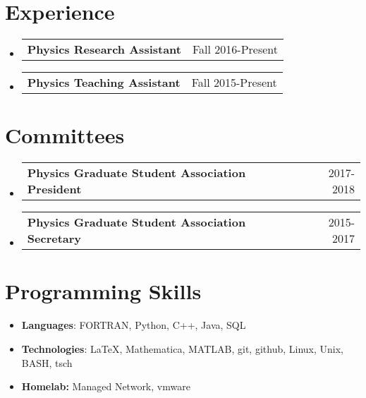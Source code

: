\documentclass[letterpaper,11pt]{article}
\makeatletter
\newcommand{\resumeSubheadingg}[2]{
  \vspace{-1pt}\item
    \begin{tabular*}{0.97\textwidth}{l@{\extracolsep{\fill}}r}
      \textbf{#1} & #2 \\
    \end{tabular*}\vspace{-5pt}
}
\newcommand{\resumeSubHeadingListStart}{\begin{itemize}[leftmargin=*]}
\newcommand{\resumeSubHeadingListEnd}{\end{itemize}}
\makeatother
\begin{document}
\section{Experience}
  \resumeSubHeadingListStart
  
    \resumeSubheadingg
      {Physics Research Assistant}{Fall 2016-Present}
    \resumeSubheadingg
      {Physics Teaching Assistant}{ Fall 2015-Present}
  \resumeSubHeadingListEnd
\section{Committees}
  \resumeSubHeadingListStart
      \resumeSubheadingg
      {Physics Graduate Student Association President}{ 2017-2018}
    \resumeSubheadingg
      {Physics Graduate Student Association Secretary}{2015-2017}

  \resumeSubHeadingListEnd




\section{Programming Skills}
  \resumeSubHeadingListStart
      \item{\textbf{Languages}{: FORTRAN, Python, C++, Java, SQL}}
      \item{
      \textbf{Technologies}{: LaTeX, Mathematica, MATLAB, git, github, Linux, Unix, BASH, tsch }}
      
    
    \item{\textbf{Homelab:}{ Managed Network, vmware}}
  \resumeSubHeadingListEnd


\end{document}
